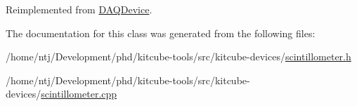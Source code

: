Reimplemented from \hyperlink{classDAQDevice_a7685cec80865752cc0ef3ab49c6c2277}{D\-A\-Q\-Device}.



The documentation for this class was generated from the following files\-:\begin{DoxyCompactItemize}
\item 
/home/ntj/\-Development/phd/kitcube-\/tools/src/kitcube-\/devices/\hyperlink{scintillometer_8h}{scintillometer.\-h}\item 
/home/ntj/\-Development/phd/kitcube-\/tools/src/kitcube-\/devices/\hyperlink{scintillometer_8cpp}{scintillometer.\-cpp}\end{DoxyCompactItemize}
